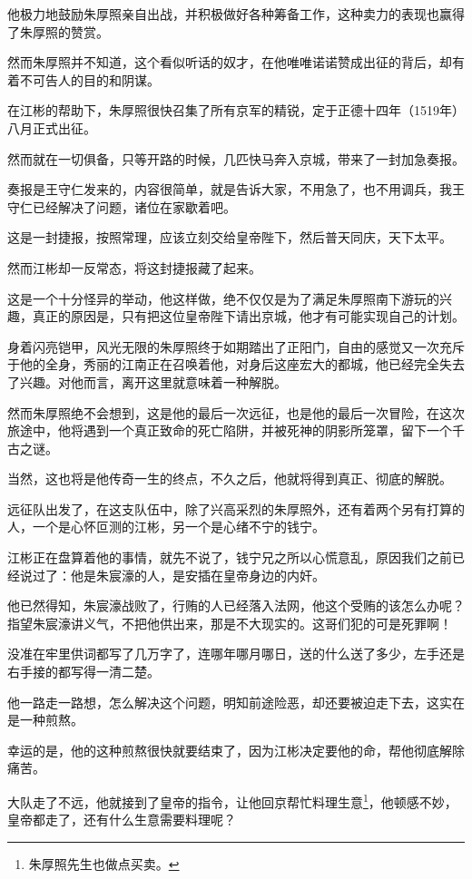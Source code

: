 \begin{multicols}{\theparacolNo}
他极力地鼓励朱厚照亲自出战，并积极做好各种筹备工作，这种卖力的表现也赢得了朱厚照的赞赏。

然而朱厚照并不知道，这个看似听话的奴才，在他唯唯诺诺赞成出征的背后，却有着不可告人的目的和阴谋。

在江彬的帮助下，朱厚照很快召集了所有京军的精锐，定于正德十四年（1519年）八月正式出征。

然而就在一切俱备，只等开路的时候，几匹快马奔入京城，带来了一封加急奏报。

奏报是王守仁发来的，内容很简单，就是告诉大家，不用急了，也不用调兵，我王守仁已经解决了问题，诸位在家歇着吧。

这是一封捷报，按照常理，应该立刻交给皇帝陛下，然后普天同庆，天下太平。

然而江彬却一反常态，将这封捷报藏了起来。

这是一个十分怪异的举动，他这样做，绝不仅仅是为了满足朱厚照南下游玩的兴趣，真正的原因是，只有把这位皇帝陛下请出京城，他才有可能实现自己的计划。

身着闪亮铠甲，风光无限的朱厚照终于如期踏出了正阳门，自由的感觉又一次充斥于他的全身，秀丽的江南正在召唤着他，对身后这座宏大的都城，他已经完全失去了兴趣。对他而言，离开这里就意味着一种解脱。

然而朱厚照绝不会想到，这是他的最后一次远征，也是他的最后一次冒险，在这次旅途中，他将遇到一个真正致命的死亡陷阱，并被死神的阴影所笼罩，留下一个千古之谜。

当然，这也将是他传奇一生的终点，不久之后，他就将得到真正、彻底的解脱。

远征队出发了，在这支队伍中，除了兴高采烈的朱厚照外，还有着两个另有打算的人，一个是心怀叵测的江彬，另一个是心绪不宁的钱宁。

江彬正在盘算着他的事情，就先不说了，钱宁兄之所以心慌意乱，原因我们之前已经说过了：他是朱宸濠的人，是安插在皇帝身边的内奸。

他已然得知，朱宸濠战败了，行贿的人已经落入法网，他这个受贿的该怎么办呢？指望朱宸濠讲义气，不把他供出来，那是不大现实的。这哥们犯的可是死罪啊！

没准在牢里供词都写了几万字了，连哪年哪月哪日，送的什么送了多少，左手还是右手接的都写得一清二楚。

他一路走一路想，怎么解决这个问题，明知前途险恶，却还要被迫走下去，这实在是一种煎熬。

幸运的是，他的这种煎熬很快就要结束了，因为江彬决定要他的命，帮他彻底解除痛苦。

大队走了不远，他就接到了皇帝的指令，让他回京帮忙料理生意\footnote{朱厚照先生也做点买卖。}，他顿感不妙，皇帝都走了，还有什么生意需要料理呢？


\end{multicols}
